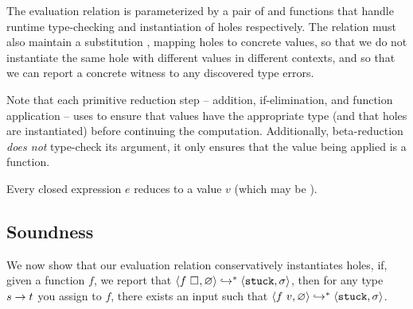 The evaluation relation is parameterized by a pair of \forcesym and
\gensym functions that handle runtime type-checking and instantiation of
holes respectively.
%
The relation must also maintain a substitution \su, mapping holes to
concrete values, so that we do not instantiate the same hole with
different values in different contexts, and so that we can report a
concrete witness to any discovered type errors.

Note that each primitive reduction step -- addition, if-elimination, and
function application -- uses \forcesym to ensure that values have the
appropriate type (and that holes are instantiated) before continuing the
computation.
%
Additionally, beta-reduction \emph{does not} type-check its argument, it
only ensures that the value being applied is a function.
%
\begin{thm}
\label{thm:all-reduce}
  Every closed expression $e$ reduces to a value $v$ (which may be \stuck).
\end{thm}
%
\subsection{Soundness}
\label{sec:soundness}
We now show that our evaluation relation conservatively instantiates
holes, \ie if, given a function $f$, we report that
$\langle f \ \square_{}, \varnothing \rangle \hookrightarrow^{*} \langle \mathtt{stuck}, \sigma \rangle$,
then for any type ${s} \rightarrow t$ you assign to $f$, there exists an input  such that
$\langle f \ v, \varnothing \rangle \hookrightarrow^{*} \langle \mathtt{stuck}, \sigma \rangle$.

